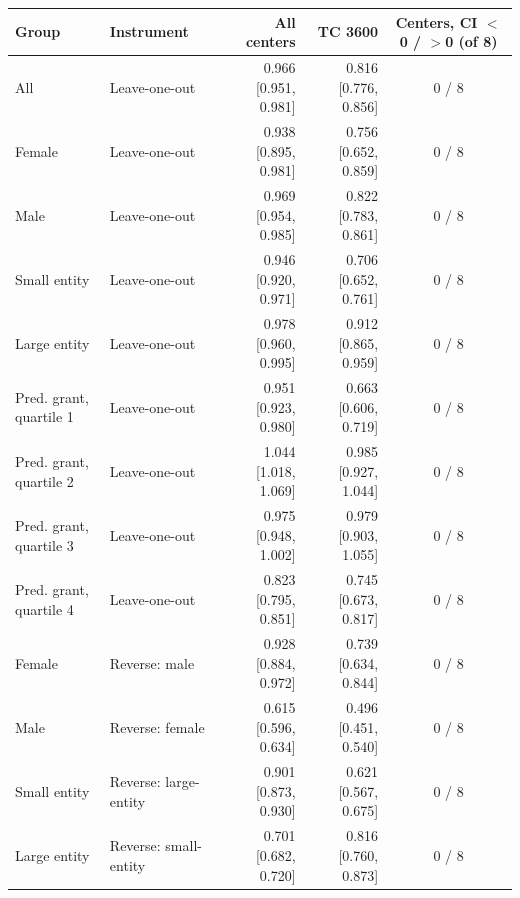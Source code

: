 \begin{tabular}{llrrc}
\toprule
Group & Instrument & All centers & TC 3600 & Centers, CI $<$0 / $>$0 (of 8) \\
\midrule
All & Leave-one-out & 0.966 [0.951, 0.981] & 0.816 [0.776, 0.856] & 0 / 8 \\
Female & Leave-one-out & 0.938 [0.895, 0.981] & 0.756 [0.652, 0.859] & 0 / 8 \\
Male & Leave-one-out & 0.969 [0.954, 0.985] & 0.822 [0.783, 0.861] & 0 / 8 \\
Small entity & Leave-one-out & 0.946 [0.920, 0.971] & 0.706 [0.652, 0.761] & 0 / 8 \\
Large entity & Leave-one-out & 0.978 [0.960, 0.995] & 0.912 [0.865, 0.959] & 0 / 8 \\
Pred. grant, quartile 1 & Leave-one-out & 0.951 [0.923, 0.980] & 0.663 [0.606, 0.719] & 0 / 8 \\
Pred. grant, quartile 2 & Leave-one-out & 1.044 [1.018, 1.069] & 0.985 [0.927, 1.044] & 0 / 8 \\
Pred. grant, quartile 3 & Leave-one-out & 0.975 [0.948, 1.002] & 0.979 [0.903, 1.055] & 0 / 8 \\
Pred. grant, quartile 4 & Leave-one-out & 0.823 [0.795, 0.851] & 0.745 [0.673, 0.817] & 0 / 8 \\
Female & Reverse: male & 0.928 [0.884, 0.972] & 0.739 [0.634, 0.844] & 0 / 8 \\
Male & Reverse: female & 0.615 [0.596, 0.634] & 0.496 [0.451, 0.540] & 0 / 8 \\
Small entity & Reverse: large-entity & 0.901 [0.873, 0.930] & 0.621 [0.567, 0.675] & 0 / 8 \\
Large entity & Reverse: small-entity & 0.701 [0.682, 0.720] & 0.816 [0.760, 0.873] & 0 / 8 \\
\bottomrule
\end{tabular}

